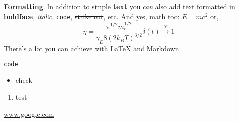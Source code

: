 \textbf{Formatting}. In addition to simple \textbf{text} you \textit{can} also add text formatted in \textbf{boldface}, \textit{italic}, \verb|code|, \sout{strike out}, etc. And yes, math too: $E  =  mc^{2}$ or,
\begin{equation}
\eta = \frac{\pi^{1/2}m_e^{1/2}}{\gamma_E 8 (2k_BT)^{3/2}} \delta(t) \xrightarrow{\mathscr{F}} 1
\end{equation}
There's a lot you can achieve with \href{https://www.authorea.com/users/3/articles/6868/_show_article}{LaTeX} and \href{https://help.github.com/articles/github-flavored-markdown/}{Markdown}. 

\verb|code|

\begin{itemize}
\item check
\end{itemize}

\begin{enumerate}
\item test
\end{enumerate}
\href{www.google.com}{www.google.com}